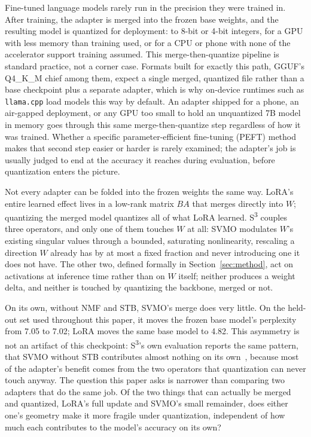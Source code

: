\documentclass[conference]{IEEEtran}
\begin{document}
Fine-tuned language models rarely run in the precision they were trained in. After training, the adapter is merged into the frozen base weights, and the resulting model is quantized for deployment: to 8-bit or 4-bit integers, for a GPU with less memory than training used, or for a CPU or phone with none of the accelerator support training assumed. This merge-then-quantize pipeline is standard practice, not a corner case. Formats built for exactly this path, GGUF's Q4\_K\_M chief among them, expect a single merged, quantized file rather than a base checkpoint plus a separate adapter, which is why on-device runtimes such as \texttt{llama.cpp} load models this way by default. An adapter shipped for a phone, an air-gapped deployment, or any GPU too small to hold an unquantized 7B model in memory goes through this same merge-then-quantize step regardless of how it was trained. Whether a specific parameter-efficient fine-tuning (PEFT) method makes that second step easier or harder is rarely examined; the adapter's job is usually judged to end at the accuracy it reaches during evaluation, before quantization enters the picture.

Not every adapter can be folded into the frozen weights the same way. LoRA's~\cite{hu2021lora} entire learned effect lives in a low-rank matrix $BA$ that merges directly into $W$; quantizing the merged model quantizes all of what LoRA learned. S\textsuperscript{3} couples three operators, and only one of them touches $W$ at all: SVMO modulates $W$'s existing singular values through a bounded, saturating nonlinearity, rescaling a direction $W$ already has by at most a fixed fraction and never introducing one it does not have. The other two, defined formally in Section~\ref{sec:method}, act on activations at inference time rather than on $W$ itself; neither produces a weight delta, and neither is touched by quantizing the backbone, merged or not.

On its own, without NMF and STB, SVMO's merge does very little. On the held-out set used throughout this paper, it moves the frozen base model's perplexity from 7.05 to 7.02; LoRA moves the same base model to 4.82. This asymmetry is not an artifact of this checkpoint: S\textsuperscript{3}'s own evaluation reports the same pattern, that SVMO without STB contributes almost nothing on its own~\cite{s3paper}, because most of the adapter's benefit comes from the two operators that quantization can never touch anyway. The question this paper asks is narrower than comparing two adapters that do the same job. Of the two things that can actually be merged and quantized, LoRA's full update and SVMO's small remainder, does either one's geometry make it more fragile under quantization, independent of how much each contributes to the model's accuracy on its own?
\end{document}
